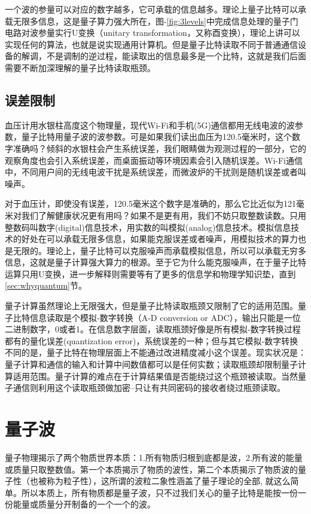 \documentclass{ctexbook}
\begin{document}
一个波的参量可以对应的数字越多，它可承载的信息越多。理论上量子比特可以承载无限多信息，这是量子算力强大所在，图-\ref{fig:3levels}中完成信息处理的量子门电路对波参量实行U变换（unitary transformation，又称酉变换），理论上讲可以实现任何的算法，也就是说实现通用计算机。但是量子比特读取不同于普通通信设备的解调，不是调制的逆过程，能读取出的信息最多是一个比特，这就是我们后面需要不断加深理解的量子比特读取瓶颈。

\subsection{误差限制}
血压计用水银柱高度这个物理量，现代Wi-Fi和手机(5G)通信都用无线电波的波参数，量子比特用量子波的波参数。可是如果我们读出血压为120.5毫米时，这个数字准确吗？倾斜的水银柱会产生系统误差，我们眼睛做为观测过程的一部分，它的观察角度也会引入系统误差，而桌面振动等环境因素会引入随机误差。Wi-Fi通信中，不同用户间的无线电波干扰是系统误差，而微波炉的干扰则是随机误差或者叫噪声。

对于血压计，即使没有误差，120.5毫米这个数字是准确的，那么它比近似为121毫米对我们了解健康状况更有用吗？如果不是更有用，我们不妨只取整数读数。只用整数码叫数字(digital)信息技术，用实数的叫模拟(analog)信息技术。模拟信息技术的好处在可以承载无限多信息，如果能克服误差或者噪声，用模拟技术的算力也是无限的。理论上，量子比特可以克服噪声而承载模拟信息，所以可以承载无穷多信息，这就是量子计算强大算力的根源。至于它为什么能克服噪声，在于量子比特运算只用U变换，进一步解释则需要等有了更多的信息学和物理学知识垫，直到\ref{sec:whyquantum}节。

量子计算虽然理论上无限强大，但是量子比特读取瓶颈又限制了它的适用范围。量子比特信息读取是个模拟-数字转换（A-D conversion or ADC），输出只能是一位二进制数字，0或者1。在信息数字层面，读取瓶颈好像是所有模拟-数字转换过程都有的量化误差(quantization error)，系统误差的一种；但与其它模拟-数字转换不同的是，量子比特在物理层面上不能通过改进精度减小这个误差。现实状况是：量子计算和通信的输入和计算中间数值都可以是任何实数；读取瓶颈却限制量子计算适用范围。量子计算的难点在于计算结果值是否能绕过这个瓶颈被读取。当然量子通信则利用这个读取瓶颈做加密--只让有共同密码的接收者绕过瓶颈读取。

\section{量子波}
量子物理揭示了两个物质世界本质：1.所有物质归根到底都是波，2.所有波的能量或质量只取整数值。第一个本质揭示了物质的波性，第二个本质揭示了物质波的量子性（也被称为粒子性），这所谓的波粒二象性涵盖了量子理论的全部, 就这么简单。所以本质上，所有物质都是量子波，只不过我们关心的量子比特是能按一份一份能量或质量分开制备的一个一个的波。
\end{document}
